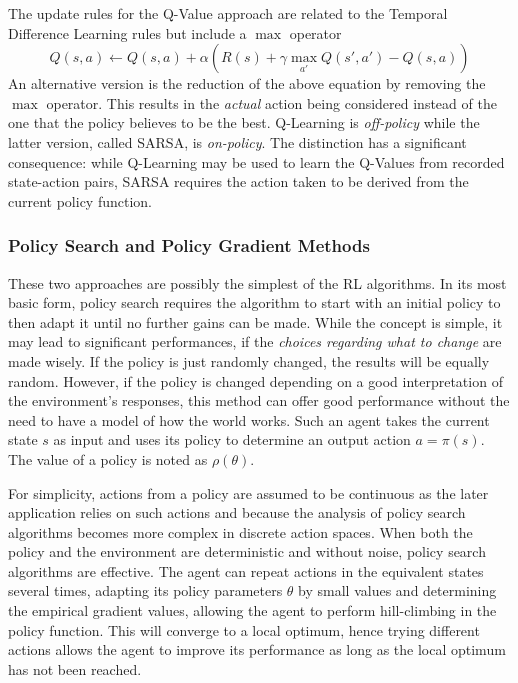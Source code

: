 The update rules for the Q-Value approach are related to the Temporal Difference Learning rules but include a $\max$
operator
\begin{equation}
    Q(s,a) \gets Q(s,a) + \alpha(R(s) + \gamma \max_{a'}Q(s', a') - Q(s,a))
\end{equation}
An alternative version is the reduction of the above equation by removing the $\max$ operator. This results in the
\emph{actual} action being considered instead of the one that the policy believes to be the best. Q-Learning is
\emph{off-policy} while the latter version, called \ac{SARSA}, is \emph{on-policy}. The distinction has a significant
consequence: while Q-Learning may be used to learn the Q-Values from recorded state-action pairs, \ac{SARSA} requires
the action taken to be derived from the current policy function.

\subsubsection{Policy Search and Policy Gradient Methods}%
\label{sub:policy_search_and_policy_gradient_methods}

These two approaches are possibly the simplest of the \ac{RL} algorithms. In its most basic form, policy search requires
the algorithm to start with an initial policy to then adapt it until no further gains can be made. While the
concept is simple, it may lead to significant performances, if the \emph{choices regarding what to change} are made
wisely. If the policy is just randomly changed, the results will be equally random. However, if the policy is changed depending
on a good interpretation of the environment's responses, this method can offer good performance without the need
to have a model of how the world works. Such an agent takes the current state $s$ as input and uses its policy to
determine an output action $a = \pi(s)$. The value of a policy is noted as $\rho(\theta)$.

For simplicity, actions from a policy are assumed to be continuous as the later application relies on
such actions and because the analysis of policy search algorithms becomes more complex in discrete action spaces. When
both the policy and the environment are deterministic and without noise, policy search algorithms are effective.
The agent can repeat actions in the equivalent states several times, adapting its policy parameters $\theta$ by small
values and determining the empirical gradient values, allowing the agent to perform hill-climbing in the policy
function. This will converge to a local optimum, hence trying different actions allows the agent to improve its
performance as long as the local optimum has not been reached.

